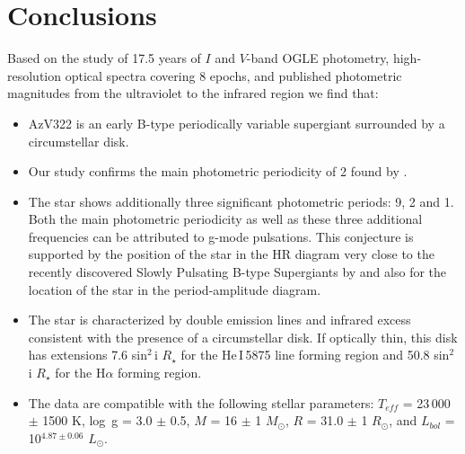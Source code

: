 \documentclass[useAMS,usenatbib]{mn2e}
\def\msun{\hbox{$M_{\odot}$}~}
\def\rsun{$R_{\odot}$}
\def\msun{$M_{\odot}$}
\begin{document}
 \section{Conclusions}

Based on the study of 17.5 years of $I$ and $V$-band OGLE photometry, high-resolution optical spectra covering 8 epochs, and
published photometric magnitudes from the ultraviolet to the infrared region we find that:

\begin{itemize}

\item AzV322 is an early B-type periodically variable supergiant surrounded by a circumstellar disk.

\item  Our study confirms the main photometric periodicity of 2 found by \cite{2014A&A...562A.125K}.

\item The star shows  additionally three significant photometric periods:  9,  2 and 1. Both the main photometric  periodicity as well as these three additional frequencies can be attributed to g-mode pulsations. This conjecture is supported by the position of the star in the HR diagram very close to the recently discovered Slowly Pulsating B-type Supergiants by  \citet{2006ApJ...650.1111S} and also for the location of the star in the period-amplitude diagram.

\item The star is characterized by double emission lines and infrared excess consistent with the presence of a circumstellar disk. If optically thin, this disk has extensions 7.6  sin$^{2}$\,i $R_{\star}$  for the He\,I\,5875 line forming region and 50.8  sin$^{2}$\,i $R_{\star}$ for the H$\alpha$ forming region. 

\item The data are compatible with the  following stellar parameters: $T_{eff}$ = 23\,000 $\pm$ 1500 K, log\, g = 3.0 $\pm$ 0.5, $M$ = 16 $\pm$ 1 \msun, $R$ = 31.0 $\pm$ 1 \rsun,  and  $L_{bol}$ = 10$^{4.87 \pm 0.06}$ $L_{\odot}$. 



\end{itemize}
\end{document}
